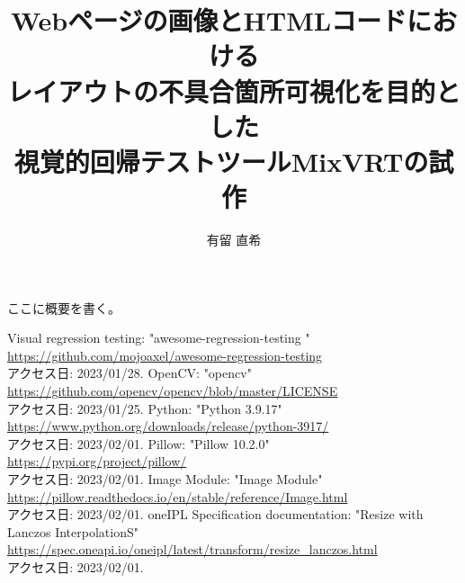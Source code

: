 \documentclass[uplatex, report, a4j, 10pt]{jsbook}
\title{Webページの画像とHTMLコードにおける\\レイアウトの不具合箇所可視化を目的とした\\視覚的回帰テストツールMixVRTの試作}
\author{有留 直希}
\begin{document}
\maketitle

%
% 
ここに概要を書く。


%
% 








%


%
\begin{thebibliography}{0}
    Visual regression testing: "awesome-regression-testing
    "\\\url{https://github.com/mojoaxel/awesome-regression-testing}\\アクセス日: 2023/01/28.
    OpenCV: "opencv"\\\url{https://github.com/opencv/opencv/blob/master/LICENSE}\\アクセス日: 2023/01/25.
    Python: "Python 3.9.17"\\\url{https://www.python.org/downloads/release/python-3917/}\\アクセス日: 2023/02/01.
    Pillow: "Pillow 10.2.0"\\\url{https://pypi.org/project/pillow/}\\アクセス日: 2023/02/01.
    Image Module: "Image Module"\\\url{https://pillow.readthedocs.io/en/stable/reference/Image.html}\\アクセス日: 2023/02/01.
    oneIPL Specification documentation: "Resize with Lanczos InterpolationS"\\\url{https://spec.oneapi.io/oneipl/latest/transform/resize_lanczos.html}\\アクセス日: 2023/02/01.
    
    

\end{thebibliography}
\end{document}
